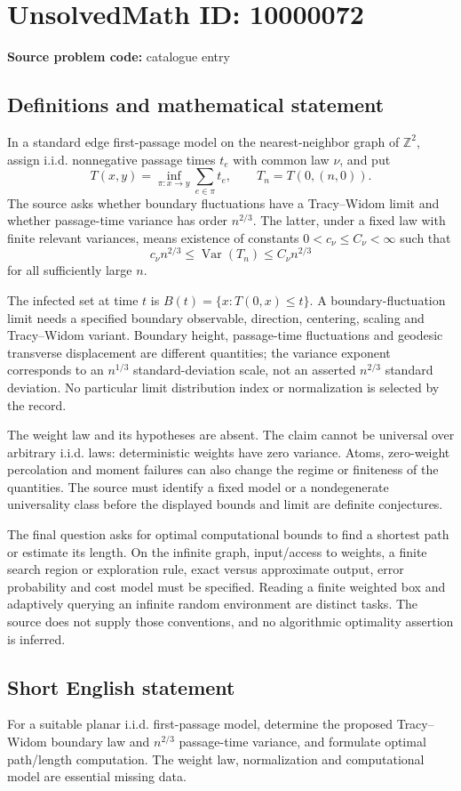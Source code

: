 \documentclass[11pt]{article}
\newcommand{\Z}{\mathbb{Z}}
\begin{document}
\section*{UnsolvedMath ID: 10000072}
\textbf{Source problem code:} catalogue entry
\subsection{Definitions and mathematical statement}
In a standard edge first-passage model on the nearest-neighbor graph of $\Z^2$, assign i.i.d. nonnegative passage times $t_e$ with common law $\nu$, and put
\[
T(x,y)=\inf_{\pi:x\to y}\sum_{e\in\pi}t_e,\qquad T_n=T(0,(n,0)).
\]
The source asks whether boundary fluctuations have a Tracy--Widom limit and whether passage-time variance has order $n^{2/3}$. The latter, under a fixed law with finite relevant variances, means existence of constants $0<c_\nu\leq C_\nu<\infty$ such that
\[
c_\nu n^{2/3}\leq\operatorname{Var}(T_n)\leq C_\nu n^{2/3}
\]
for all sufficiently large $n$.

The infected set at time $t$ is $B(t)=\{x:T(0,x)\leq t\}$. A boundary-fluctuation limit needs a specified boundary observable, direction, centering, scaling and Tracy--Widom variant. Boundary height, passage-time fluctuations and geodesic transverse displacement are different quantities; the variance exponent corresponds to an $n^{1/3}$ standard-deviation scale, not an asserted $n^{2/3}$ standard deviation. No particular limit distribution index or normalization is selected by the record.

The weight law and its hypotheses are absent. The claim cannot be universal over arbitrary i.i.d. laws: deterministic weights have zero variance. Atoms, zero-weight percolation and moment failures can also change the regime or finiteness of the quantities. The source must identify a fixed model or a nondegenerate universality class before the displayed bounds and limit are definite conjectures.

The final question asks for optimal computational bounds to find a shortest path or estimate its length. On the infinite graph, input/access to weights, a finite search region or exploration rule, exact versus approximate output, error probability and cost model must be specified. Reading a finite weighted box and adaptively querying an infinite random environment are distinct tasks. The source does not supply those conventions, and no algorithmic optimality assertion is inferred.
\subsection{Short English statement}
For a suitable planar i.i.d. first-passage model, determine the proposed Tracy--Widom boundary law and $n^{2/3}$ passage-time variance, and formulate optimal path/length computation. The weight law, normalization and computational model are essential missing data.
\end{document}
